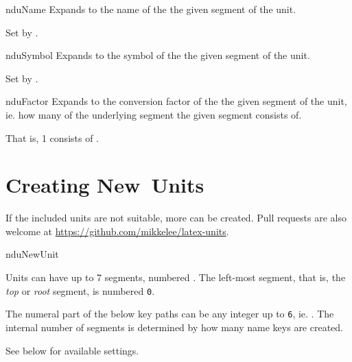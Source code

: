 \documentclass{article}
\begin{document}
\begin{docCommand}
	{nduName}
	{}
	Expands to the name of the the given segment of the unit.
	
	Set by .
\end{docCommand}

\begin{docCommand}
	{nduSymbol}
	{}
	Expands to the symbol of the the given segment of the unit.
	
	Set by .
\end{docCommand}

\begin{docCommand}
	{nduFactor}
	{}
	Expands to the conversion factor of the the given segment of the unit, ie. how many of the underlying segment the given segment consists of.

\begin{dispExample}
That is, 1  consists of
 .
\end{dispExample}
\end{docCommand}

\clearpage
\section{Creating New Units} %

\label{units:new}
If the included units are not suitable, more can be created. Pull requests are also welcome at \url{https://github.com/mikkelee/latex-units}.

\begin{docCommand}
	{nduNewUnit}
	{}
	
Units can have up to 7 segments, numbered . The left-most segment, that is, the \emph{top} or \emph{root} segment, is numbered \texttt{0}.

The numeral part of the below key paths  can be any integer up to \texttt{6}, ie. . The internal number of segments is determined by how many name keys are created.

See below for available settings.

\end{docCommand}
\end{document}

